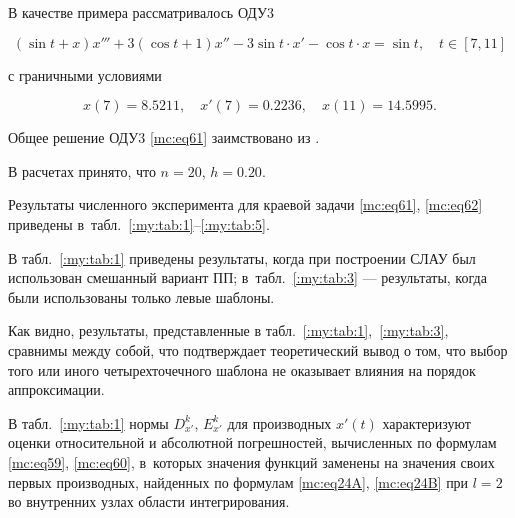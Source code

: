 В качестве примера рассматривалось ОДУ3

\begin{equation}

\label{mc:eq61}

   (\sin t +x)x'''+3 (\cos t +1 ) x''-3\sin t \cdot x'-\cos t \cdot x= \sin t, \quad t \in [7, 11]

\end{equation}

с граничными условиями

\begin{equation}

\label{mc:eq62}

   x(7)=8{.}5211,\quad x'(7)=0{.}2236,\quad x(11)=14{.}5995.

\end{equation}

Общее решение ОДУ3 \eqref{mc:eq61}  заимствовано из \cite{mc:bib17}.



В расчетах принято, что $n=20$,  $h=0{.}20$. 

Результаты численного эксперимента для краевой задачи \eqref{mc:eq61}, \eqref{mc:eq62} приведены в~табл.~\ref{:my:tab:1}--\ref{:my:tab:5}.



В табл.~\ref{:my:tab:1} приведены результаты, когда при построении СЛАУ был использован смешанный вариант ПП; в~табл.~\ref{:my:tab:3}  --- результаты, когда были использованы только левые шаблоны.

Как видно, результаты, представленные в табл.~\ref{:my:tab:1},~\ref{:my:tab:3},   сравнимы между собой, что подтверждает теоретический вывод о том, что выбор того или иного четырехточечного шаблона не оказывает влияния на порядок аппроксимации.



В табл.~\ref{:my:tab:1} нормы  $   D_{x'}^k$,    $   E_{x'}^k$  для производных $   x'(t)$  характеризуют  оценки относительной и абсолютной погрешностей, вычисленных по формулам \eqref{mc:eq59}, \eqref{mc:eq60}, в~которых значения функций заменены на значения своих первых производных, найденных по формулам \eqref{mc:eq24A}, \eqref{mc:eq24B} при $l=2$ во внутренних узлах области интегрирования.




